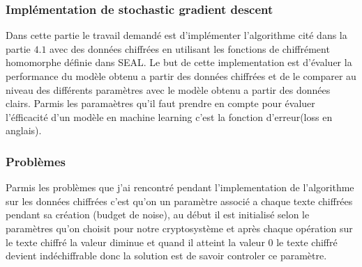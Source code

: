 \documentclass[a4paper,12pt]{article}
\begin{document}
  \subsubsection{Implémentation de stochastic gradient descent} 
  Dans cette partie le travail demandé est d'implémenter l'algorithme cité dans la partie $4.1$ avec des données chiffrées en utilisant les fonctions de chiffrément homomorphe définie dans SEAL. \newline 
  Le but de cette implementation est d'évaluer la performance du modèle obtenu a partir des données chiffrées et de le comparer au niveau des différents paramètres avec le modèle obtenu a partir des données clairs.\newline
  Parmis les paramaètres qu'il faut prendre en compte pour évaluer l'éfficacité d'un modèle en machine learning c'est la fonction d'erreur(loss en anglais).\newline  
  \subsubsection{Problèmes}
  Parmis les problèmes que j'ai rencontré pendant l'implementation de l'algorithme  sur les données chiffrées c'est qu'on un paramètre associé a chaque texte chiffrées pendant sa création (budget de noise), au début il est initialisé selon le paramètres qu'on choisit pour notre cryptosystème  et après chaque opération sur le texte chiffré la valeur diminue et quand il atteint la valeur 0 le texte chiffré devient indéchiffrable donc la solution est de savoir controler ce paramètre.
\end{document}
